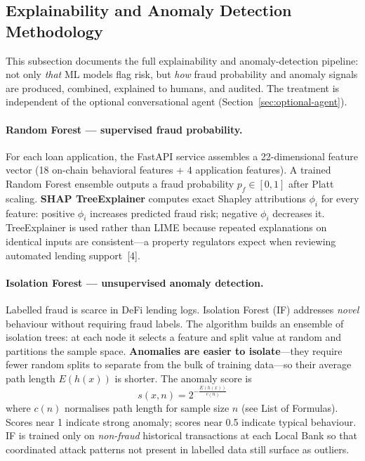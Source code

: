 \documentclass[12pt, a4paper]{report}
\begin{document}
\subsection{Explainability and Anomaly Detection Methodology}
\label{sec:ml-explainability}

This subsection documents the full explainability and anomaly-detection pipeline: not only \textit{that} ML models flag risk, but \textit{how} fraud probability and anomaly signals are produced, combined, explained to humans, and audited. The treatment is independent of the optional conversational agent (Section~\ref{sec:optional-agent}).

\paragraph{Random Forest --- supervised fraud probability.}
For each loan application, the FastAPI service assembles a 22-dimensional feature vector (18 on-chain behavioral features + 4 application features). A trained Random Forest ensemble outputs a fraud probability $p_f \in [0, 1]$ after Platt scaling. \textbf{SHAP TreeExplainer} computes exact Shapley attributions $\phi_i$ for every feature: positive $\phi_i$ increases predicted fraud risk; negative $\phi_i$ decreases it. TreeExplainer is used rather than LIME because repeated explanations on identical inputs are consistent---a property regulators expect when reviewing automated lending support~[4].

\paragraph{Isolation Forest --- unsupervised anomaly detection.}
Labelled fraud is scarce in DeFi lending logs. Isolation Forest (IF) addresses \textit{novel} behaviour without requiring fraud labels. The algorithm builds an ensemble of isolation trees: at each node it selects a feature and split value at random and partitions the sample space. \textbf{Anomalies are easier to isolate}---they require fewer random splits to separate from the bulk of training data---so their average path length $E(h(x))$ is shorter. The anomaly score is
\[s(x, n) = 2^{-\frac{E(h(x))}{c(n)}}
\]
where $c(n)$ normalises path length for sample size $n$ (see List of Formulas). Scores near 1 indicate strong anomaly; scores near 0.5 indicate typical behaviour. IF is trained only on \textit{non-fraud} historical transactions at each Local Bank so that coordinated attack patterns not present in labelled data still surface as outliers.
\end{document}
